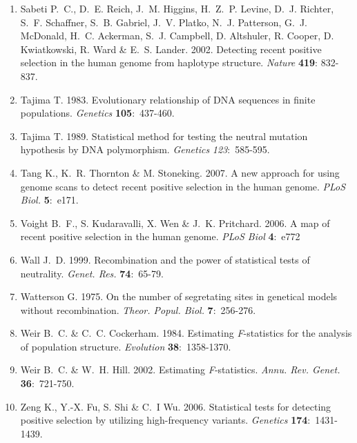 \documentclass{scrartcl}
\begin{document}
\begin{flushleft}
\begin{enumerate}[leftmargin=!,labelindent=5pt,itemindent=-15pt]
    \item[] Sabeti P.~C., D.~E. Reich, J.~M. Higgins, H.~Z.~P. Levine,
        D.~J. Richter, S.~F. Schaffner, S.~B. Gabriel, J.~V. Platko,
        N.~J. Patterson, G.~J. McDonald, H.~C. Ackerman, S.~J. Campbell,
        D. Altshuler, R. Cooper, D. Kwiatkowski, R. Ward \& E.~S.
        Lander. 2002. Detecting recent positive selection in the human
        genome from haplotype structure. \textit{Nature} \textbf{419}:
        832-837.

    \item[] Tajima T. 1983. Evolutionary relationship of DNA sequences
        in finite populations. \textit{Genetics} \textbf{105}:~437-460.

    \item[] Tajima T. 1989. Statistical method for testing the neutral
        mutation hypothesis by DNA polymorphism. \textit{Genetics}
        \textit{123}:~585-595.

    \item[] Tang K., K.~R. Thornton \& M. Stoneking. 2007. A new
        approach for using genome scans to detect recent positive
        selection in the human genome. \textit{PLoS Biol.}
        \textbf{5}:~e171.

    \item[] Voight B.~F., S. Kudaravalli, X. Wen \& J.~K. Pritchard.
        2006. A map of recent positive selection in the human genome.
        \textit{PLoS Biol} \textbf{4}:~e772

    \item[] Wall J.~D. 1999. Recombination and the power of statistical
        tests of neutrality. \textit{Genet. Res.} \textbf{74}:~65-79.

    \item[] Watterson G. 1975. On the number of segretating sites in
        genetical models without recombination. \textit{Theor. Popul.
        Biol.} \textbf{7}:~256-276.

    \item[] Weir B.~C. \& C.~C. Cockerham. 1984. Estimating
        {\em F}-statistics for the analysis of population structure.
        \textit{Evolution} \textbf{38}:~1358-1370.

    \item[] Weir B.~C. \& W.~H. Hill. 2002. Estimating
        {\em F}-statistics. \textit{Annu. Rev. Genet.}
        \textbf{36}:~721-750.

    \item[] Zeng K., Y.-X. Fu, S. Shi \& C.~I Wu. 2006. Statistical
        tests for detecting positive selection by utilizing
        high-frequency variants. \textit{Genetics}
        \textbf{174}:~1431-1439.

\end{enumerate}
\end{flushleft}
\end{document}

